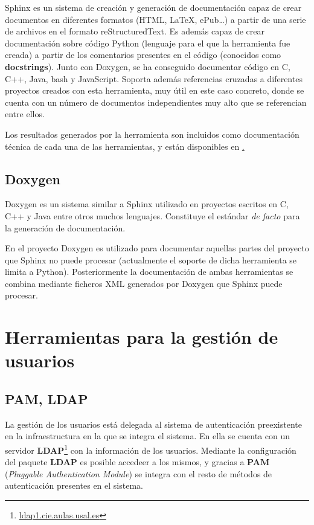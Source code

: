 Sphinx es un sistema de creación y generación de documentación capaz de crear documentos en diferentes formatos (HTML, \LaTeX, ePub\dots) a partir de una serie de archivos en el formato reStructuredText. Es además capaz de crear documentación sobre código Python (lenguaje para el que la herramienta fue creada) a partir de los comentarios presentes en el código (conocidos como \textbf{docstrings}). Junto con Doxygen, se ha conseguido documentar código en C, C++, Java, bash y JavaScript. Soporta además referencias cruzadas a diferentes proyectos creados con esta herramienta, muy útil en este caso concreto, donde se cuenta con un número de documentos independientes muy alto que se referencian entre ellos.

Los resultados generados por la herramienta son incluidos como documentación técnica de cada una de las herramientas, y están disponibles en \href{marcopolo.martinarroyo.net}.

\subsection{Doxygen}

Doxygen es un sistema similar a Sphinx utilizado en proyectos escritos en C, C++ y Java entre otros muchos lenguajes. Constituye el estándar \textit{de facto} para la generación de documentación.

En el proyecto Doxygen es utilizado para documentar aquellas partes del proyecto que Sphinx no puede procesar (actualmente el soporte de dicha herramienta se limita a Python). Posteriormente la documentación de ambas herramientas se combina mediante ficheros XML generados por Doxygen que Sphinx puede procesar.

\section{Herramientas para la gestión de usuarios}

\subsection{PAM, LDAP}

La gestión de los usuarios está delegada al sistema de autenticación preexistente en la infraestructura en la que se integra el sistema. En ella se cuenta con un servidor \textbf{LDAP}\footnote{\href{ldap1.cie.aulas.usal.es}{ldap1.cie.aulas.usal.es}} con la información de los usuarios. Mediante la configuración del paquete \textbf{LDAP} es posible accedeer a los mismos, y gracias a \textbf{PAM} (\textit{Pluggable Authentication Module}) se integra con el resto de métodos de autenticación presentes en el sistema.

